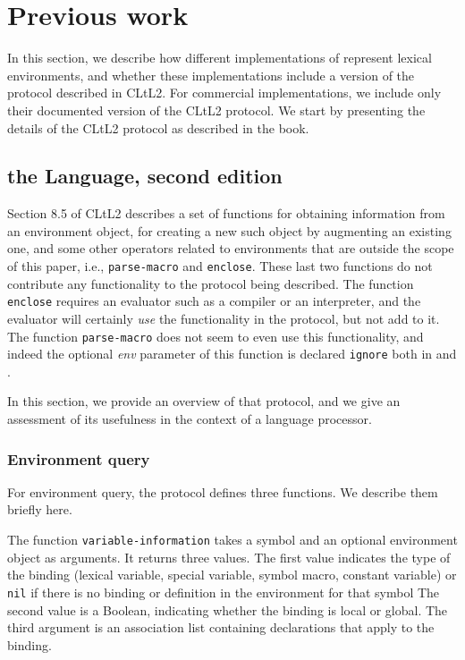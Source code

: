 \section{Previous work}

In this section, we describe how different implementations of
\commonlisp{} represent lexical environments, and whether these
implementations include a version of the protocol described in CLtL2.
For commercial implementations, we include only their documented
version of the CLtL2 protocol.  We start by presenting the details of
the CLtL2 protocol as described in the book.

\subsection{\commonlisp{} the Language, second edition}

Section 8.5 of CLtL2 describes a set of functions for obtaining
information from an environment object, for creating a new such object
by augmenting an existing one, and some other operators related to
environments that are outside the scope of this paper, i.e.,
\texttt{parse-macro} and \texttt{enclose}.  These last two functions
do not contribute any functionality to the protocol being described.
The function \texttt{enclose} requires an evaluator such as a compiler
or an interpreter, and the evaluator will certainly \emph{use} the
functionality in the protocol, but not add to it.  The function 
\texttt{parse-macro} does not seem to even use this functionality, and
indeed the optional \textit{env} parameter of this function is
declared \texttt{ignore} both in \sbcl{} and \ccl{}.

In this section, we provide an overview of that protocol, and we give
an assessment of its usefulness in the context of a language processor.

\subsubsection{Environment query}

For environment query, the protocol defines three functions.  We
describe them briefly here.

The function \texttt{variable-information} takes a symbol and an
optional environment object as arguments.  It returns three values.
The first value indicates the type of the binding (lexical variable,
special variable, symbol macro, constant variable) or \texttt{nil} if
there is no binding or definition in the environment for that symbol
The second value is a Boolean, indicating whether the binding is local
or global.  The third argument is an association list containing
declarations that apply to the binding.

